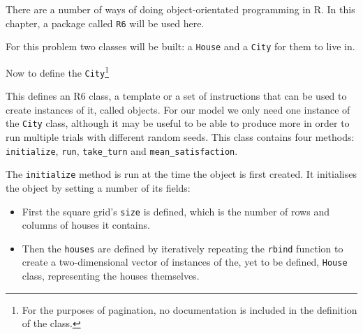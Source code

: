 There are a number of ways of doing object-orientated programming in R.
In this chapter, a package called \texttt{R6} will be used here.

For this problem two classes will be built: a
\texttt{House} and a \texttt{City} for them to live in.

Now to define the \texttt{City}\footnote{
For the purposes of pagination, no documentation is included in the definition
of the class.
}


This defines an R6 class, a template or a set of instructions that can be used
to create instances of it, called objects.
For our model we only need one instance of the \texttt{City} class,
although it may be useful to be able to produce more in order to run multiple
trials with different random seeds.
This class contains four methods: \texttt{initialize},
\texttt{run}, \texttt{take_turn} and
\texttt{mean_satisfaction}.

The \texttt{initialize} method is run at the time the object is first
created.
It initialises the object by setting a number of its fields:

\begin{itemize}
     \item First the square grid's \texttt{size} is defined, which
           is the number of rows and columns of houses it contains.
     \item Then the \texttt{houses} are defined by iteratively repeating
           the \texttt{rbind} function to create a two-dimensional vector
           of instances of the, yet to be defined, \texttt{House} class,
           representing the houses themselves.
\end{itemize}

